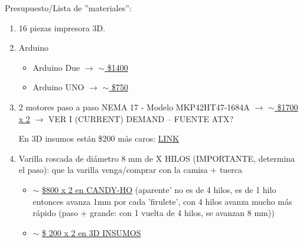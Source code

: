 \documentclass[12pt,dvipsnames]{exam}
\begin{document}
Presupuesto/Lista de ''materiales'':

\begin{enumerate}
	\item 16 piezas impresora 3D.
	\item Arduino \begin{itemize}
	
	\item Arduino Due $\xrightarrow{}$ \href{https://candy-ho.com/producto/arduino-due-r3-cable-usb-atsam3x8e-arm-cortex-m3-512-kb/}{$\sim$ \$1400}
	
	\item Arduino UNO $\xrightarrow{}$ \href{https://candy-ho.com/producto/arduino-uno-r3-cable-usb-domotica-robotica-atmel-original/}{$\sim$ \$750} 	
	\end{itemize}
	\item 2 motores paso a paso NEMA 17 - Modelo MKP42HT47-1684A $\xrightarrow{}$ \href{https://candy-ho.com/producto/motor-nema-17-alto-torque-0-9-4-4kg-impresora-3d-prusa-i3/}{$\sim$ \$1700 x 2} $\xrightarrow{}$ VER I (CURRENT) DEMAND -- FUENTE ATX? 
	
	En 3D insumos están \$200 más caros: \href{https://3dinsumos.com.ar/Producto/3DPrinter-Nema17-AltoTorque0.9}{LINK}

\item Varilla roscada de diámetro 8 mm de X HILOS (IMPORTANTE, determina el paso): que la varilla venga/comprar con la camisa + tuerca
\begin{itemize}
\item  $\sim$ \href{https://candy-ho.com/producto/varilla-rosca-husillo-ctornillo-prusa-reprap-8mm-400mm/}{\$800 x 2 en CANDY-HO} (aparente' no es de 4 hilos, es de 1 hilo entonces avanza 1mm por cada 'firulete', con 4 hilos avanza mucho más rápido (paso + grande: con 1 vuelta de 4 hilos, se avanzan 8 mm))
\item $\sim$ \href{https://3dinsumos.com.ar/Producto/3D-VarillaRoscadaM8}{\$ 200 x 2 en 3D INSUMOS} 
\end{itemize}


\end{enumerate}
\end{document}
